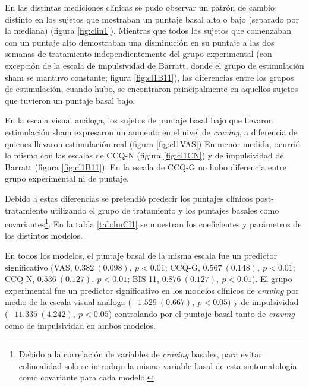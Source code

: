 En las distintas mediciones clínicas se pudo observar un patrón de cambio distinto en los sujetos que mostraban un puntaje basal alto o bajo (separado por la mediana) (figura \ref{fig:clin1}). Mientras que todos los sujetos que comenzaban con un puntaje alto demostraban una disminución en su puntaje a las dos semanas de tratamiento independientemente del grupo experimental (con excepción de la escala de impulsividad de Barratt, donde el grupo de estimulación sham se mantuvo constante; figura \ref{fig:cl1B11}), las diferencias entre los grupos de estimulación, cuando hubo, se encontraron principalmente en aquellos sujetos que tuvieron un puntaje basal bajo. \par
En la escala visual análoga, los sujetos de puntaje basal bajo que llevaron estimulación sham expresaron un aumento en el nivel de \textit{craving}, a diferencia de quienes llevaron estimulación real (figura \ref{fig:cl1VAS}) En menor medida, ocurrió lo mismo con las escalas de CCQ-N (figura \ref{fig:cl1CN}) y de impulsividad de Barratt (figura \ref{fig:cl1B11}). En la escala de CCQ-G no hubo diferencia entre grupo experimental ni de puntaje. \par

Debido a estas diferencias se pretendió predecir los puntajes clínicos post-tratamiento utilizando el grupo de tratamiento y los puntajes basales como covariantes\footnote{Debido a la correlación de variables de \textit{craving} basales, para evitar colinealidad solo se introdujo la misma variable basal de esta sintomatología como covariante para cada modelo.}. En la tabla \ref{tab:lmCl1} se muestran los coeficientes y parámetros de los distintos modelos. \par
En todos los modelos, el puntaje basal de la misma escala fue un predictor significativo (VAS, $0.382\ (0.098),\ p<0.01$; CCQ-G, $0.567\ (0.148),\ p<0.01$; CCQ-N, $0.536\ (0.127),\ p<0.01$; BIS-11, $0.876\ (0.127),\ p<0.01$). El grupo experimental fue un predictor significativo en los modelos clínicos de \textit{craving} por medio de la escala visual análoga ($-1.529\ (0.667),\ p<0.05$) y de impulsividad ($-11.335\ (4.242),\ p<0.05$) controlando por el puntaje basal tanto de \textit{craving} como de impulsividad en ambos modelos.

